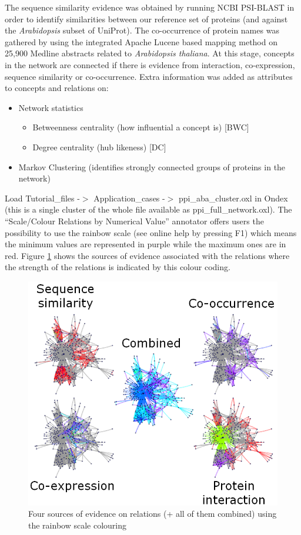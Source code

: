 The sequence similarity evidence was obtained by running NCBI PSI-BLAST in order to identify similarities between our reference set of proteins
(and against the \textit{Arabidopsis} subset of UniProt).
The co-occurrence of protein names was gathered by using the integrated Apache Lucene based mapping method on 25,900 Medline abstracts related to \textit{Arabidopsis thaliana}.
At this stage, concepts in the network are connected if there is evidence from interaction, co-expression, sequence similarity or co-occurrence.
Extra information was added as attributes to concepts and relations on: 
\begin{itemize}
\item Network statistics
	\begin{itemize}
	\item Betweenness centrality (how influential a concept is) [BWC]
	\item Degree centrality (hub likeness) [DC]
	\end{itemize}
\item Markov Clustering (identifies strongly connected groups of proteins in the network)
\end{itemize}

Load Tutorial\_files -$>$ Application\_cases -$>$ ppi\_aba\_cluster.oxl in Ondex 
(this is a single cluster of the whole file available as ppi\_full\_network.oxl).
The ``Scale/Colour Relations by Numerical Value'' annotator offers users the possibility to use the rainbow scale (see online help by pressing F1)
which means the minimum values are represented in purple while the maximum ones are in red.
Figure \ref{fig:aba_cluster} shows the sources of evidence associated with the relations where the strength of the relations 
is indicated by this colour coding.
\begin{figure}[H]
\centering
\includegraphics[scale=0.5]{images/Oct12/aba_cluster.png} 
\caption{Four sources of evidence on relations (+ all of them combined) using the rainbow scale colouring}
\label{fig:aba_cluster}
\end{figure}

